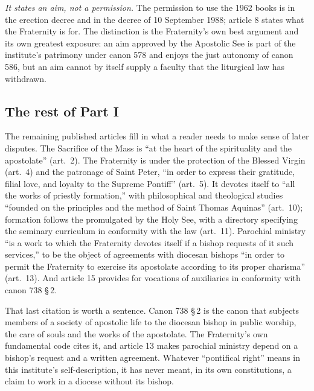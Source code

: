 \emph{It states an aim, not a permission.} The permission to use the 1962
books is in the erection decree and in the decree of 10 September 1988;
article 8 states what the Fraternity is for. The distinction is the
Fraternity's own best argument and its own greatest exposure: an aim
approved by the Apostolic See is part of the institute's patrimony under
canon 578 and enjoys the just autonomy of canon 586, but an aim cannot by
itself supply a faculty that the liturgical law has withdrawn.

\subsection{The rest of Part I}

The remaining published articles fill in what a reader needs to make
sense of later disputes. The Sacrifice of the Mass is ``at the heart of
the spirituality and the apostolate'' (art.~2). The Fraternity is under
the protection of the Blessed Virgin (art.~4) and the patronage of Saint
Peter, ``in order to express their gratitude, filial love, and loyalty to
the Supreme Pontiff'' (art.~5). It devotes itself to ``all the works of
priestly formation,'' with philosophical and theological studies
``founded on the principles and the method of Saint Thomas Aquinas''
(art.~10); formation follows the  promulgated by
the Holy See, with a directory specifying the seminary curriculum in
conformity with the law (art.~11). Parochial ministry ``is a work to
which the Fraternity devotes itself if a bishop requests of it such
services,'' to be the object of agreements with diocesan bishops
``in order to permit the Fraternity to exercise its apostolate according
to its proper charisma'' (art.~13). And article 15 provides for
vocations of auxiliaries in conformity with canon 738 §\,2.

That last citation is worth a sentence. Canon 738 §\,2 is the canon that
subjects members of a society of apostolic life to the diocesan bishop in
public worship, the care of souls and the works of the apostolate. The
Fraternity's own fundamental code cites it, and article 13 makes
parochial ministry depend on a bishop's request and a written agreement.
Whatever ``pontifical right'' means in this institute's self-description,
it has never meant, in its own constitutions, a claim to work in a
diocese without its bishop.

